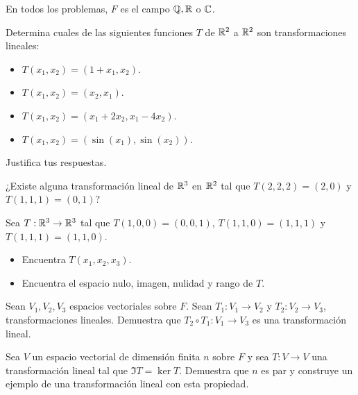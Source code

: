 \documentclass[12pt,a4paper]{book}
\newcommand{\parentesis}[1]{\left(#1\right)}
\begin{document}
    En todos los problemas, $F$ es el campo $\mathbb{Q}, \mathbb{R}$ o $\mathbb{C}$.

    \begin{ejercicio}
        Determina cuales de las siguientes funciones $T$ de $\mathbb{R}^2$ a $\mathbb{R}^2$ son transformaciones lineales:
        \begin{itemize}
            \item[(a)] $T(x_1, x_2) = \parentesis{1 + x_1, x_2}$.
            \item[(b)] $T(x_1, x_2) = \parentesis{x_2, x_1}$.
            \item[(c)] $T(x_1, x_2) = \parentesis{x_1 + 2x_2, x_1 - 4x_2}$.
            \item[(d)] $T(x_1, x_2) = \parentesis{\sin(x_1), \sin (x_2)}$.
        \end{itemize}
        Justifica tus respuestas.
    \end{ejercicio}

    \begin{ejercicio}
        ¿Existe alguna transformación lineal de $\mathbb{R}^3$ en $\mathbb{R}^2$ tal que $T(2, 2, 2) = (2, 0)$ y $T(1, 1, 1) = (0, 1)$?
    \end{ejercicio}

    \begin{ejercicio}
        Sea $T: \mathbb{R}^3 \to \mathbb{R}^3$ tal que $T(1, 0, 0) = (0, 0, 1)$, $T(1, 1, 0) = (1, 1, 1)$ y $T(1, 1, 1) = (1, 1, 0)$.
        \begin{itemize}
            \item[(a)] Encuentra $T(x_1, x_2, x_3)$.
            \item[(b)] Encuentra el espacio nulo, imagen, nulidad y rango de $T$.
        \end{itemize}
    \end{ejercicio}

    \begin{ejercicio}
        Sean $V_1, V_2, V_3$ espacios vectoriales sobre $F$. Sean $T_1:V_1 \to V_2$ y $T_2: V_2 \to V_3$, transformaciones lineales. Demuestra que $T_2 \circ T_1 : V_1 \to V_3$ es una transformación lineal.
    \end{ejercicio}

    \begin{ejercicio}
        Sea $V$ un espacio vectorial de dimensión finita $n$ sobre $F$ y sea $T: V \to V$ una transformación lineal tal que $\Im {T} = \ker {T}$. Demuestra que $n$ es par y construye un ejemplo de una transformación lineal con esta propiedad.
    \end{ejercicio}
\end{document}
